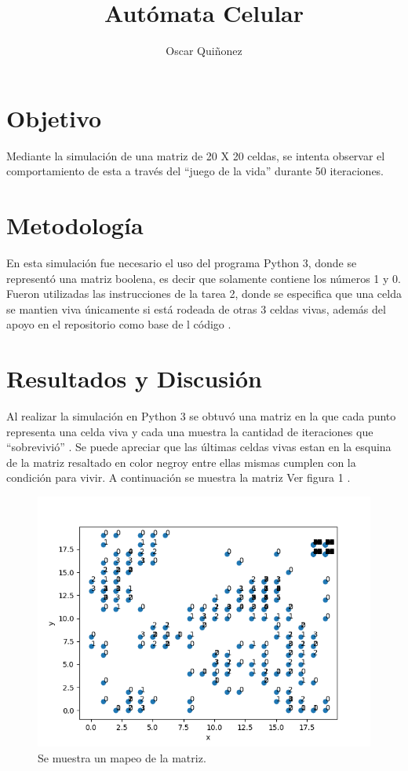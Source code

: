 \documentclass{article}
\title { Aut\'omata Celular}
\author{Oscar Qui\~nonez}
\begin{document}
\maketitle
 
\section{Objetivo}\label{met}

Mediante la simulaci\'on de una matriz de 20 X 20 celdas, se intenta observar el comportamiento de esta a trav\'es del ``juego de la vida'' durante 50 iteraciones.

\section{Metodolog\'ia}\label{met}

En esta simulaci\'on fue necesario el uso del programa Python 3, donde se represent\'o una matriz boolena, es decir que solamente contiene los n\'umeros 1 y 0.  Fueron utilizadas las instrucciones \cite{satuelisa} de la tarea 2, donde se especifica que una celda se mantien viva \'unicamente si est\'a rodeada de otras 3 celdas vivas, adem\'as del apoyo en el repositorio  \cite{baz} como base de l c\'odigo .

\section{Resultados y Discusi\'on}\label{res}

Al realizar la simulaci\'on en Python 3 se obtuv\'o una matriz en la que cada punto representa una celda viva y cada una muestra la cantidad de iteraciones que ``sobrevivi\'o'' . Se puede apreciar que las \'ultimas celdas vivas estan en la esquina de la matriz resaltado en color negroy entre ellas mismas cumplen con la condici\'on para vivir. A continuaci\'on se muestra la matriz Ver figura 1 .

\begin{figure}

 \begin{center}
\includegraphics[scale=0.8]{Figure_3.png}
\end{center}
  \caption{Se muestra un mapeo de la matriz.}
  \label{f1}
 
\end{figure}
 
\end{document}
